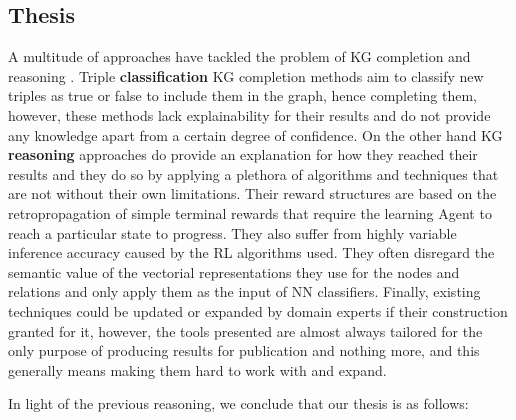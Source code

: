 
\subsection{Thesis}


A multitude of approaches have tackled the problem of KG completion \cite{bordes2013translating, wang2014knowledge, lin2015learning, sun2019rotate, trouillon2016complex, nickel2011three, balavzevic2019tucker, BorregoAHRR21, Sola2023AYNEXT} and reasoning \cite{socher2013reasoning, lao2011random, das2017go, xiong2017deeppath, lin2018multi, xian2019reinforcement, tiwari2021dapath, cui2023incorporating, cui2023reinforcement}. Triple \textbf{classification} KG completion methods aim to classify new triples as true or false to include them in the graph, hence completing them, however, these methods lack explainability for their results and do not provide any knowledge apart from a certain degree of confidence.
On the other hand KG \textbf{reasoning} approaches do provide an explanation for how they reached their results and they do so by applying a plethora of algorithms and techniques that are not without their own limitations. Their reward structures are based on the retropropagation of simple terminal rewards that require the learning Agent to reach a particular state to progress. They also suffer from highly variable inference accuracy caused by the RL algorithms used. They often disregard the semantic value of the vectorial representations they use for the nodes and relations and only apply them as the input of NN classifiers. Finally, existing techniques could be updated or expanded by domain experts if their construction granted for it, however, the tools presented are almost always tailored for the only purpose of producing results for publication and nothing more, and this generally means making them hard to work with and expand.

In light of the previous reasoning, we conclude that our thesis is as follows:


